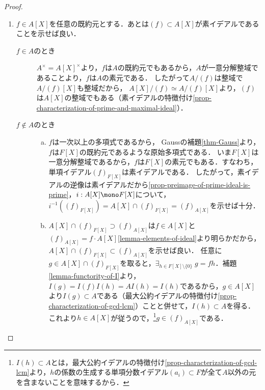 \documentclass[uplatex,dvipdfmx]{jsreport}
\begin{document}
\begin{proof}
\begin{enumerate}
\begin{enumerate}[(a)]
        \end{enumerate}
        \item $f\in A[X]$を任意の既約元とする．あとは$(f)\subset A[X]$が素イデアルであることを示せば良い．
        \begin{description}
            \item[$f\in A$のとき] $A^\times=A[X]^\times$より，$f$は$A$の既約元でもあるから，$A$が一意分解整域であることより，$f$は$A$の素元である．
            したがって$A/(f)$は整域で$A/(f)[X]$も整域だから，
            $A[X]/(f)\simeq A/(f)[X]$より，$(f)$は$A[X]$の整域でもある（素イデアルの特徴付け\ref{prop-characterization-of-prime-and-maximal-ideal}）．
            \item[$f\notin A$のとき] 
            \begin{enumerate}[(a)]
                \item 
            $f$は一次以上の多項式であるから，
            Gaussの補題\ref{thm-Gauss}より，$f$は$F[X]$の既約元であるような原始多項式である．
            いま$F[X]$は一意分解整域であるから，$f$は$F[X]$の素元でもある．すなわち，単項イデアル$(f)_{F[X]}$は素イデアルである．
            したがって，素イデアルの逆像は素イデアルだから\ref{prop-preimage-of-prime-ideal-is-prime}，$i:A[X]\mono F[X]$について，$i^{-1}((f)_{F[X]})=A[X]\cap(f)_{F[X]}=(f)_{A[X]}$を示せば十分．
                \item
            $A[X]\cap (f)_{F[X]}\supset(f)_{A[X]}$は$f\in A[X]$と$(f)_{A[X]}=f\cdot A[X]$\ref{lemma-elements-of-ideal}より明らかだから，$A[X]\cap (f)_{F[X]}\subset(f)_{A[X]}$を示せば良い．
                任意に$g\in A[X]\cap (f)_{F[X]}$を取ると，$\exists_{h\in F[X]\setminus\{0\}}\;g=fh$．補題\ref{lemma-functority-of-I}より，
                $I(g)=I(f)I(h)=AI(h)=I(h)$であるから，$g\in A[X]$より$I(g)\subset A$である（最大公約イデアルの特徴付け\ref{prop-characterization-of-gcd-lcm}）ことと併せて，$I(h)\subset A$を得る．これより$h\in A[X]$が従うので，\footnote{$I(h)\subset A$とは，最大公約イデアルの特徴付け\ref{prop-characterization-of-gcd-lcm}より，$h$の係数の生成する単項分数イデアル$(a_i)\subset F$が全て$A$以外の元を含まないことを意味するから．}$g\in (f)_{A[X]}$である．
            \end{enumerate}
        \end{description}
    \end{enumerate}
\end{proof}
\end{document}
